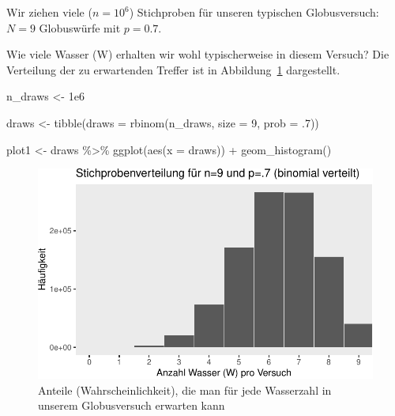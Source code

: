\documentclass[
  a4paper,
  DIV=11]{scrreprt}
\newenvironment{Shaded}{\begin{snugshade}}{\end{snugshade}}
\newcommand{\AttributeTok}[1]{\textcolor[rgb]{0.40,0.45,0.13}{#1}}
\newcommand{\DecValTok}[1]{\textcolor[rgb]{0.68,0.00,0.00}{#1}}
\newcommand{\FloatTok}[1]{\textcolor[rgb]{0.68,0.00,0.00}{#1}}
\newcommand{\FunctionTok}[1]{\textcolor[rgb]{0.28,0.35,0.67}{#1}}
\newcommand{\NormalTok}[1]{\textcolor[rgb]{0.00,0.23,0.31}{#1}}
\newcommand{\OtherTok}[1]{\textcolor[rgb]{0.00,0.23,0.31}{#1}}
\newcommand{\SpecialCharTok}[1]{\textcolor[rgb]{0.37,0.37,0.37}{#1}}
\theoremstyle{definition}
\theoremstyle{remark}
\begin{document}
Wir ziehen viele (\(n=10^6\)) Stichproben für unseren typischen
Globusversuch: \(N=9\) Globuswürfe mit \(p=0.7\).

Wie viele Wasser (W) erhalten wir wohl typischerweise in diesem Versuch?
Die Verteilung der zu erwartenden Treffer ist in
Abbildung~\ref{fig-globus-striprovert} dargestellt.

\begin{Shaded}
\begin{Highlighting}[]
\NormalTok{n\_draws }\OtherTok{\textless{}{-}} \FloatTok{1e6}

\NormalTok{draws }\OtherTok{\textless{}{-}} 
  \FunctionTok{tibble}\NormalTok{(}\AttributeTok{draws =} \FunctionTok{rbinom}\NormalTok{(n\_draws, }\AttributeTok{size =} \DecValTok{9}\NormalTok{, }\AttributeTok{prob =}\NormalTok{ .}\DecValTok{7}\NormalTok{))}

\NormalTok{plot1 }\OtherTok{\textless{}{-}} 
\NormalTok{  draws }\SpecialCharTok{\%\textgreater{}\%} 
  \FunctionTok{ggplot}\NormalTok{(}\FunctionTok{aes}\NormalTok{(}\AttributeTok{x =}\NormalTok{ draws)) }\SpecialCharTok{+}
  \FunctionTok{geom\_histogram}\NormalTok{() }
\end{Highlighting}
\end{Shaded}

\begin{figure}

{\centering \includegraphics{./ppv_files/figure-pdf/fig-globus-striprovert-1.pdf}

}

\caption{\label{fig-globus-striprovert}Anteile (Wahrscheinlichkeit), die
man für jede Wasserzahl in unserem Globusversuch erwarten kann}

\end{figure}
\end{document}
